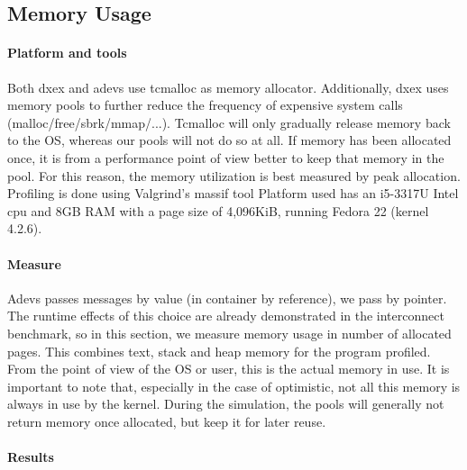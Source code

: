 \subsection{Memory Usage}
\paragraph*{Platform and tools}
Both dxex and adevs use tcmalloc as memory allocator. Additionally, dxex uses memory pools to further reduce the frequency of expensive system calls (malloc/free/sbrk/mmap/...). Tcmalloc will only gradually release memory back to the OS, whereas our pools will not do so at all. If memory has been allocated once, it is from a performance point of view better to keep that memory in the pool. For this reason, the memory utilization is best measured by peak allocation. Profiling is done using Valgrind's massif tool \cite{Nethercote:2007:VFH:1273442.1250746}
Platform used has an i5-3317U Intel cpu and 8GB RAM with a page size of 4,096KiB, running Fedora 22 (kernel 4.2.6).\\
\paragraph*{Measure}
Adevs passes messages by value (in container by reference), we pass by pointer. The runtime effects of this choice are already demonstrated in the interconnect benchmark, so in this section, we measure memory usage in number of allocated pages. This combines text, stack and heap memory for the program profiled. From the point of view of the OS or user, this is the actual memory in use. It is important to note that, especially in the case of optimistic, not all this memory is always in use by the kernel. During the simulation, the pools will generally not return memory once allocated, but keep it for later reuse.
\paragraph*{Results}
